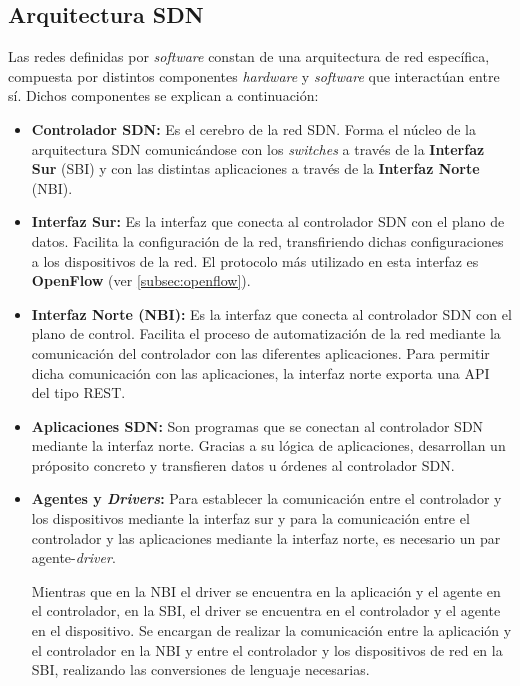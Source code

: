 \subsection{Arquitectura SDN}

Las redes definidas por \textit{software} constan de una arquitectura de red específica, compuesta por distintos componentes \textit{hardware} y \textit{software} que interactúan entre sí. Dichos componentes se explican a continuación:


\begin{itemize}
	\item \textbf{Controlador \ac{SDN}:} Es el cerebro de la red \ac{SDN}. Forma el núcleo de la arquitectura \ac{SDN} comunicándose con los \textit{switches} a través de la \textbf{Interfaz Sur} (\ac{SBI}) y con las distintas aplicaciones a través de la \textbf{Interfaz Norte} (\ac{NBI}).
	
	\item \textbf{Interfaz Sur:} Es la interfaz que conecta al controlador \ac{SDN} con el plano de datos. Facilita la configuración de la red, transfiriendo dichas configuraciones a los dispositivos de la red. El protocolo más utilizado en esta interfaz es \textbf{OpenFlow} (ver \ref{subsec:openflow}).
	
	\item \textbf{Interfaz Norte (\ac{NBI}):} Es la interfaz que conecta al controlador \ac{SDN} con el plano de control. Facilita el proceso de automatización de la red mediante la comunicación del controlador con las diferentes aplicaciones. Para permitir dicha comunicación con las aplicaciones, la interfaz norte exporta una \ac{API} del tipo \ac{REST}.
	
	\item \textbf{Aplicaciones \ac{SDN}:} Son programas que se conectan al controlador \ac{SDN} mediante la interfaz norte. Gracias a su lógica de aplicaciones, desarrollan un próposito concreto y transfieren datos u órdenes al controlador \ac{SDN}.
	
	\item \textbf{Agentes y \textit{Drivers}:} Para establecer la comunicación entre el controlador y los dispositivos mediante la interfaz sur y para la comunicación entre el controlador y las aplicaciones mediante la interfaz norte, es necesario un par agente-\textit{driver}. 
	
	Mientras que en la \ac{NBI} el driver se encuentra en la aplicación y el agente en el controlador, en la \ac{SBI}, el driver se encuentra en el controlador y el agente en el dispositivo. Se encargan de realizar la comunicación entre la aplicación y el controlador en la \ac{NBI} y entre el controlador y los dispositivos de red en la \ac{SBI}, realizando las conversiones de lenguaje necesarias.
\end{itemize}

